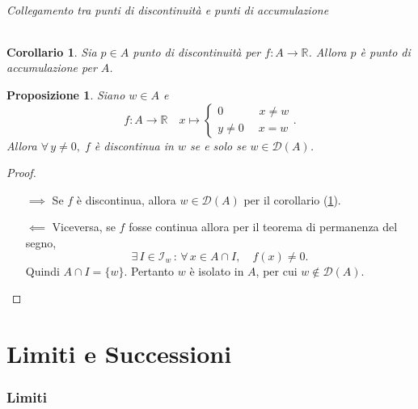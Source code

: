 \documentclass{article}
\theoremstyle{plain}
\newtheorem{prop}[thm]{Proposizione}
\newtheorem{cor}{Corollario}
\theoremstyle{definition}
\theoremstyle{remark}
\begin{document}
\paragraph{Collegamento tra punti di discontinuità e punti di accumulazione}
\begin{bxthm}
\begin{cor}\label{coroo}
    Sia $p\in A$ punto di discontinuità per $f:A\to\mathbb{R}$. Allora $p$ è punto di accumulazione per $A$.
\end{cor}
\end{bxthm}

\vspace{10pt}

\begin{bxthm}
\begin{prop}
    Siano $w\in A$ e 
    \[ f:A\to\mathbb{R}\quad
        x\mapsto\begin{cases}
            0 \quad\,\quad\quad x\neq w\\
            y\neq0 \quad\; x=w
        \end{cases}. \]
    Allora $\forall\, y\neq0, \;f$ è discontinua in $w$ se e solo se $w\in\mathcal{D}(A)$.
\end{prop}
\end{bxthm}
\begin{proof}\hfill
    \begin{itemize}
        \item[$\implies$]
        Se $f$ è discontinua, allora $w\in\mathcal{D}(A)$ per il corollario (\ref{coroo}).
        \item[$\impliedby$]
        Viceversa, se $f$ fosse continua allora per il teorema di permanenza del segno, 
        \[\exists\, I\in \mathcal{I}_w\, :\, \forall\, x\in A\cap I,\quad f(x)\neq0.\]
        Quindi $A\cap I=\{w\}$. Pertanto $w$ è isolato in $A$, per cui $w\notin\mathcal{D}(A)$.
    \end{itemize}
\end{proof}

\vspace{50pt}
\part{Limiti e Successioni}
\vspace{50pt}

\section{Limiti}
\vspace{50pt}
\end{document}

